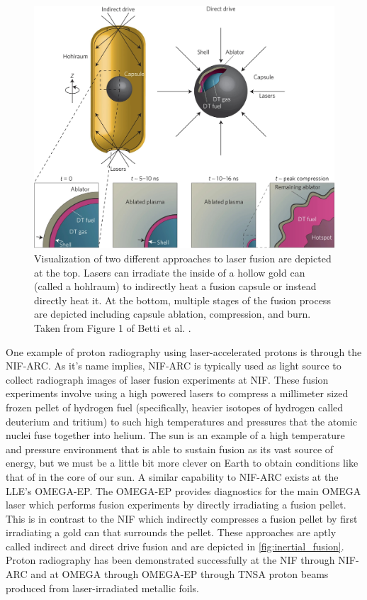 \begin{figure}
	\centering
	\includegraphics[width=0.75\linewidth]{planning/images/fusion.png}
	\caption{Visualization of two different approaches to laser fusion are depicted at the top. Lasers can irradiate the inside of a hollow gold can (called a hohlraum) to indirectly heat a fusion capsule or instead directly heat it. At the bottom, multiple stages of the fusion process are depicted including capsule ablation, compression, and burn. Taken from Figure 1 of Betti et al. \cite{Betti_2016_Nature}. }
	\label{fig:inertial_fusion}
\end{figure}

One example of proton radiography using laser-accelerated protons is through the \gls{NIF-ARC}. As it's name implies, \gls{NIF-ARC} is typically used as light source to collect radiograph images of laser fusion experiments at NIF. These fusion experiments involve using a high powered lasers to compress a millimeter sized frozen pellet of hydrogen fuel (specifically, heavier isotopes of hydrogen called deuterium and tritium) to such high temperatures and pressures that the atomic nuclei fuse together into helium. The sun is an example of a high temperature and pressure environment that is able to sustain fusion as its vast source of energy, but we must be a little bit more clever on Earth to obtain conditions like that of in the core of our sun. A similar capability to NIF-ARC exists at the \gls{LLE}'s \gls{OMEGA-EP}. The \gls{OMEGA-EP} provides diagnostics for the main OMEGA laser which performs fusion experiments by directly irradiating a fusion pellet. This is in contrast to the \gls{NIF} which indirectly compresses a fusion pellet by first irradiating a gold can that surrounds the pellet. These approaches are aptly called indirect and direct drive fusion and are depicted in \autoref{fig:inertial_fusion}. Proton radiography has been demonstrated successfully at the \gls{NIF} through \gls{NIF-ARC} \cite{Simpson_2021_PPCF} and at OMEGA through \gls{OMEGA-EP} \cite{Zylstra_2012_RSI} through \gls{TNSA} proton beams produced from laser-irradiated metallic foils.

